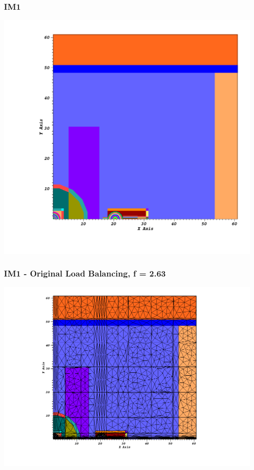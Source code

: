 \documentclass[compress]{beamer}
\begin{document}
\begin{frame}[t]\frametitle{IM1}
\centering
\includegraphics[scale=0.25]{figures/IM12D_val.png}
\end{frame}

\begin{frame}[t]\frametitle{IM1 - Original Load Balancing, f = 2.63}
\centering
\includegraphics[scale=0.33]{figures/IM1_old_load_balance.png}
\end{frame}
\end{document}
